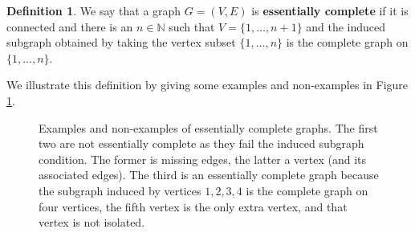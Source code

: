 \documentclass[12pt]{article}
\theoremstyle{definition}
\newtheorem{definition}[proposition]{Definition}
\begin{document}
\begin{definition}\label{essentially complete definition} We say that a graph $G=(V,E)$ is \textbf{essentially complete} if it is connected and there is an $n \in \mathbb{N}$ such that $V=\{1,\ldots,n+1\}$ and the induced subgraph obtained by taking the vertex subset $\{1,\ldots,n\}$ is the complete graph on $\{1,\ldots,n\}$. 
\end{definition}
We illustrate this definition by giving some examples and non-examples in Figure \ref{fig:essential completesness}.
\begin{figure}[t]
    \centering

    \caption{Examples and non-examples of essentially complete graphs. The first two are not essentially complete as they fail the induced subgraph condition. The former is missing edges, the latter a vertex (and its associated edges). The third is an essentially complete graph because the subgraph induced by vertices $1,2,3,4$ is the complete graph on four vertices, the fifth vertex is the only extra vertex, and that vertex is not isolated.}
    \label{fig:essential completesness}
\end{figure}
\end{document}
